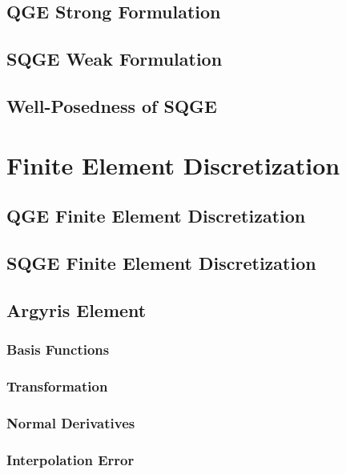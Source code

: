 \documentclass[12pt]{VTthesis}
\begin{document}
    \section{QGE Strong Formulation} \label{sec:QGEStrong}
    
    \section{SQGE Weak Formulation} \label{sec:SQGEStrong}
    
    \section{Well-Posedness of SQGE} \label{sec:WellPosed}
    

    \chapter{Finite Element Discretization}\label{ch:FEM}
    
    \section{QGE Finite Element Discretization} \label{sec:QGEFEM}
    
    \section{SQGE Finite Element Discretization} \label{sec:SQGEFEM}
    
    \section{Argyris Element} \label{sec:Argyris}
    
      \subsection{Basis Functions} \label{sse:Basis}
      
      \subsection{Transformation} \label{sse:Trans}
      
      \subsection{Normal Derivatives} \label{sse:Normals}
      
      \subsection{Interpolation Error} \label{sse:IntErr}
      
\end{document}

